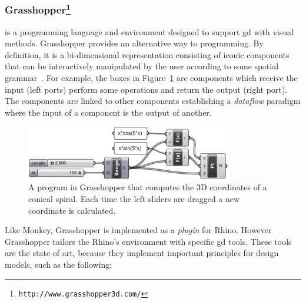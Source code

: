\subsubsection{Grasshopper\protect\footnote{\texttt{http://www.grasshopper3d.com/}}} is a programming language and environment designed to support \ac{gd} with visual methods. Grasshopper provides an alternative way to programming. By definition, it is a bi-dimensional representation consisting of iconic components that can be interactively manipulated by the user according to some spatial grammar~\cite{myers1990taxonomies}. For example, the boxes in Figure~\ref{fig:grass} are components which receive the input (left ports) perform some operations and return the output (right port). The components are linked to other components establishing a \textit{dataflow} paradigm where the input of a component is the output of another.

\begin{figure}[!htbp]
  \centering
  \includegraphics[width=0.8\textwidth]{img/grasshopper}
    \caption{A program in Grasshopper that computes the 3D coordinates of a conical spiral. Each time the left sliders are dragged a new coordinate is calculated.}
  \label{fig:grass}
\end{figure}

Like Monkey, Grasshopper is implemented as a \textit{plugin} for Rhino\footnotemark[\ref{rhin}]. However Grasshopper tailors the Rhino's environment with specific \ac{gd} tools. These tools are the state of art, because they implement important principles for design models, such as the following:

